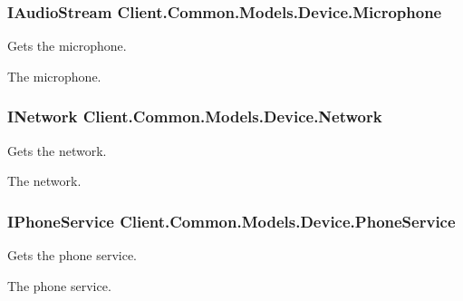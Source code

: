 \subsubsection[{Microphone}]{\setlength{\rightskip}{0pt plus 5cm}I\+Audio\+Stream Client.\+Common.\+Models.\+Device.\+Microphone\hspace{0.3cm}{\ttfamily [get]}}\label{classClient_1_1Common_1_1Models_1_1Device_a6f726201e56a1d46ef8ebd20adf638df}


Gets the microphone. 

The microphone.\hypertarget{classClient_1_1Common_1_1Models_1_1Device_a46cdd7f011a2059ee7a3f1e18bc9fae6}{}
\subsubsection[{Network}]{\setlength{\rightskip}{0pt plus 5cm}I\+Network Client.\+Common.\+Models.\+Device.\+Network\hspace{0.3cm}{\ttfamily [get]}}\label{classClient_1_1Common_1_1Models_1_1Device_a46cdd7f011a2059ee7a3f1e18bc9fae6}


Gets the network. 

The network.\hypertarget{classClient_1_1Common_1_1Models_1_1Device_ad96d3be9bec959a2900b8ff9c3133174}{}
\subsubsection[{Phone\+Service}]{\setlength{\rightskip}{0pt plus 5cm}I\+Phone\+Service Client.\+Common.\+Models.\+Device.\+Phone\+Service\hspace{0.3cm}{\ttfamily [get]}}\label{classClient_1_1Common_1_1Models_1_1Device_ad96d3be9bec959a2900b8ff9c3133174}


Gets the phone service. 

The phone service.\hypertarget{classClient_1_1Common_1_1Models_1_1Device_a9809c0bb9a9868fe59b09afdf9b4fa30}{}
